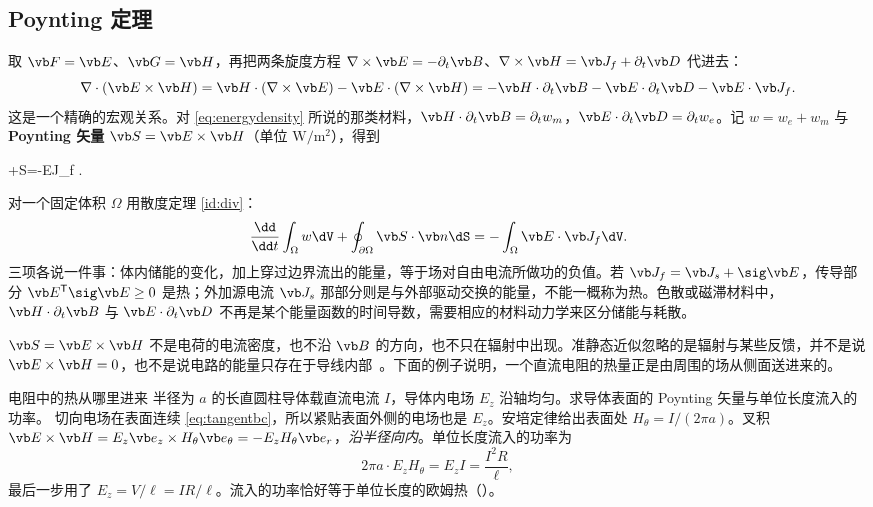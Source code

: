 \subsection{Poynting 定理}
取 $\vb F=\vb E$、$\vb G=\vb H$，再把两条旋度方程 $\nabla\times\vb E=-\partial_t\vb B$、$\nabla\times\vb H=\vb J_f+\partial_t\vb D$ 代进去：
\begin{equation}
\nabla\cdot(\vb E\times\vb H)=\vb H\cdot(\nabla\times\vb E)-\vb E\cdot(\nabla\times\vb H)
=-\vb H\cdot\partial_t\vb B-\vb E\cdot\partial_t\vb D-\vb E\cdot\vb J_f .
\label{eq:poyntinggeneral}
\end{equation}
这是一个精确的宏观关系。对 \eqref{eq:energydensity} 所说的那类材料，$\vb H\cdot\partial_t\vb B=\partial_tw_m$，$\vb E\cdot\partial_t\vb D=\partial_tw_e$。记 $w=w_e+w_m$ 与 \textbf{Poynting 矢量} $\vb S=\vb E\times\vb H$（单位 $\mathrm{W/m^2}$），得到
\begin{keyeq}
+\nabla\cdot\vb S=-\vb E\cdot\vb J_f .
\label{eq:poynting}
\end{keyeq}
对一个固定体积 $\Omega$ 用散度定理 \eqref{id:div}：
\begin{equation}
\frac{\dd}{\dd t}\int_\Omega w\dV+\oint_{\partial\Omega}\vb S\cdot\vb n\dS=-\int_\Omega\vb E\cdot\vb J_f\dV .
\label{eq:poyntingintegral}
\end{equation}
三项各说一件事：体内储能的变化，加上穿过边界流出的能量，等于场对自由电流所做功的负值。若 $\vb J_f=\vb J_s+\sig\vb E$，传导部分 $\vb E^{\mathsf T}\sig\vb E\ge0$ 是热；外加源电流 $\vb J_s$ 那部分则是与外部驱动交换的能量，不能一概称为热。色散或磁滞材料中，$\vb H\cdot\partial_t\vb B$ 与 $\vb E\cdot\partial_t\vb D$ 不再是某个能量函数的时间导数，需要相应的材料动力学来区分储能与耗散。

\begin{pitfall}
$\vb S=\vb E\times\vb H$ 不是电荷的电流密度，也不沿 $\vb B$ 的方向，也不只在辐射中出现。准静态近似忽略的是辐射与某些反馈，并不是说 $\vb E\times\vb H=0$，也不是说电路的能量只存在于导线内部~\cite{haus}。下面的例子说明，一个直流电阻的热量正是由周围的场从侧面送进来的。
\end{pitfall}

\begin{example}{电阻中的热从哪里进来}\label{ex:systems-poynting}
半径为 $a$ 的长直圆柱导体载直流电流 $I$，导体内电场 $E_z$ 沿轴均匀。求导体表面的 Poynting 矢量与单位长度流入的功率。
\solution
切向电场在表面连续 \eqref{eq:tangentbc}，所以紧贴表面外侧的电场也是 $E_z$。安培定律给出表面处 $H_\theta=I/(2\pi a)$。叉积 $\vb E\times\vb H=E_z\vb e_z\times H_\theta\vb e_\theta=-E_zH_\theta\vb e_r$，\emph{沿半径向内}。单位长度流入的功率为
\begin{equation*}
2\pi a\cdot E_zH_\theta=E_zI=\frac{I^2R}{\ell},
\end{equation*}
最后一步用了 $E_z=V/\ell=IR/\ell$。流入的功率恰好等于单位长度的欧姆热（）。
\end{example}

